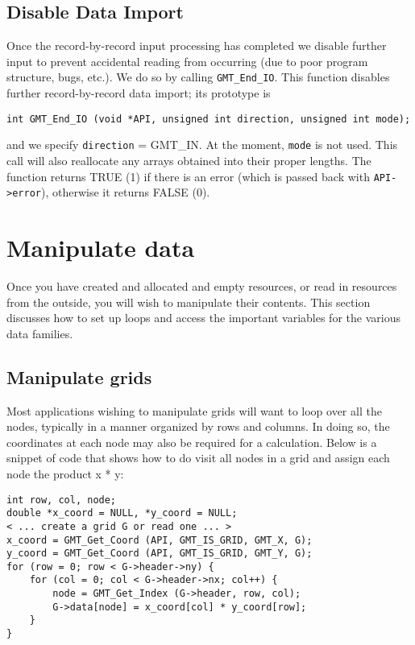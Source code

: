 \documentclass[11pt]{report}
\begin{document}
\subsection{Disable Data Import}

Once the record-by-record input processing has completed we disable further input to prevent accidental
reading from occurring (due to poor program structure, bugs, etc.).  We do so by calling \texttt{GMT\_End\_IO}.  This
function disables further record-by-record data import; its prototype is

\begin{verbatim}
int GMT_End_IO (void *API, unsigned int direction, unsigned int mode);
\end{verbatim}

\noindent
and we specify \texttt{direction} = GMT\_IN.  At the moment, \texttt{mode} is not used.  This call
will also reallocate any arrays obtained into their proper lengths.
The function returns TRUE (1) if there is an error (which is passed back with \texttt{API->error}),
otherwise it returns FALSE (0).

\section{Manipulate data}
\label{sec:manipulate}

Once you have created and allocated and empty resources, or read in resources from the outside, you
will wish to manipulate their contents.  This section discusses how to set up loops and access
the important variables for the various data families.

\subsection{Manipulate grids}

Most applications wishing to manipulate grids will want to loop over all the nodes, typically
in a manner organized by rows and columns.  In doing so, the coordinates at each node may also
be required for a calculation.  Below is a snippet of code that shows how to do
visit all nodes in a grid and assign each node the product x * y:

\begin{verbatim}
int row, col, node;
double *x_coord = NULL, *y_coord = NULL;
< ... create a grid G or read one ... >
x_coord = GMT_Get_Coord (API, GMT_IS_GRID, GMT_X, G);
y_coord = GMT_Get_Coord (API, GMT_IS_GRID, GMT_Y, G);
for (row = 0; row < G->header->ny) {
    for (col = 0; col < G->header->nx; col++) {
        node = GMT_Get_Index (G->header, row, col);
        G->data[node] = x_coord[col] * y_coord[row];
    }
}
\end{verbatim}
\end{document}
